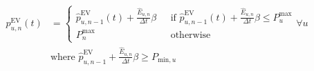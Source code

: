 \begin{equation}
\begin{split}
	p^\text{EV}_{u,n}(t) &=
	\begin{cases}
		\hat{p}^\text{EV}_{u,n-1}(t) + \frac{\hat{E}_{u,n}}{\Delta t}\beta \text{   }&\text{if } \hat{p}^\text{EV}_{u,n-1}(t) + \frac{\hat{E}_{u,n}}{\Delta t}\beta \leq P^\text{max}_{u}\\
		P^\text{max}_{n} &\text{otherwise}
 	\end{cases}
 	\forall u \\
 	&\text{where } \hat{p}^\text{EV}_{u,n-1} + \frac{\hat{E}_{u,n}}{\Delta t}\beta \geq P_{\text{min},u}
\end{split}
\label{ch3:equ:valley-filling-equation}
\end{equation}